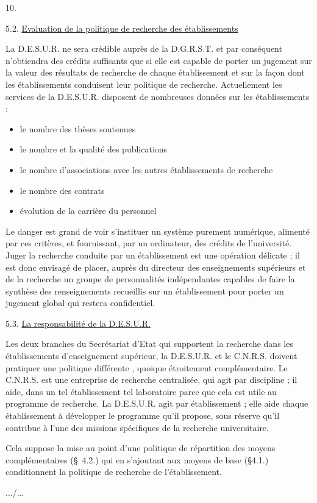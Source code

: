 
10.

5.2. \uline{Evaluation de la politique de recherche des établissements}

La D.E.S.U.R. ne sera crédible auprès de la D.G.R.S.T. et par conséquent n'obtiendra des crédits suffisants que si elle est capable de porter un jugement sur la valeur des résultats de recherche de chaque établissement et sur la façon dont les établissements conduisent leur politique de recherche. Actuellement les services de la D.E.S.U.R. disposent de nombreuses données sur les établissements :

\begin{itemize}
\item[-] le nombre des thèses soutenues
\item[-] le nombre et la qualité des publications
\item[-] le nombre d'associations avec les autres établissements de recherche
\item[-] le nombre des contrats
\item[-] évolution de la carrière du personnel
\end{itemize}

Le danger est grand de voir s'instituer un système purement numérique, alimenté par ces critères, et fournissant, par un ordinateur,  des crédits de l'université. Juger la recherche conduite par un établissement est une opération délicate ; il est donc envisagé de placer, auprès du directeur des enseignements supérieurs et de la recherche un groupe de personnalités indépendantes capables de faire la synthèse des renseignements recueillis sur un établissement pour porter un jugement global qui restera confidentiel.

5.3. \uline{La responsabilité de la D.E.S.U.R.}

Les deux branches du Secrétariat d'Etat qui supportent la recherche dans les établissements d'enseignement supérieur, la D.E.S.U.R. et le C.N.R.S. doivent pratiquer une politique différente , quoique étroitement complémentaire. Le C.N.R.S. est une entreprise de recherche centralisée, qui agit par discipline ; il aide, dans un tel établissement tel laboratoire parce que cela est utile au programme de recherche. La D.E.S.U.R. agit par établissement ; elle aide chaque établissement à développer le programme qu'il propose, sous réserve qu'il contribue à l'une des missions spécifiques de la recherche universitaire.

Cela suppose la mise au point d'une politique de répartition des moyens complémentaires (\S\ 4.2.) qui en s'ajoutant aux moyens de base (\S4.1.) conditionnent la politique de recherche de l'établissement.

.../...

